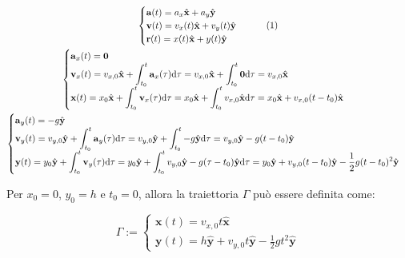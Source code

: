 \documentclass{article}
\newcommand{\vect}[1]{\boldsymbol{\mathbf{#1}}}
\newcommand{\df}{\mathrm{d}}
\numberwithin{equation}{subsection}
\begin{document}
\begin{gather*}
    \begin{cases}
        \vect{a}(t) = a_x\hat{\vect{x}} +a_y\hat{\vect{y}}\\
        \vect{v}(t) = v_x(t)\hat{\vect{x}} + v_y(t)\hat{\vect{y}}\\
        \vect{r}(t) = x(t)\hat{\vect{x}} + y(t)\hat{\vect{y}}
    \end{cases}\tag{\stepcounter{equation}\theequation}\\
    \begin{cases}
        \vect{a}_x(t) = \vect{0}\\
        \vect{v}_x(t) =\displaystyle v_{x,0}\hat{\vect{x}}+\int_{t_0}^{t}\vect{a}_x(\tau)\df\tau=v_{x,0}\hat{\vect{x}}+ \int_{t_0}^{t}\vect{0}\df\tau=v_{x,0}\hat{\vect{x}}\\
        \vect{x}(t) = \displaystyle x_0\hat{\vect{x}}+\int_{t_0}^{t}\vect{v}_x(\tau)\df\tau = x_0\hat{\vect{x}}+\int_{t_0}^{t}v_{x,0}\hat{\vect{x}}\df\tau=x_0\hat{\vect{x}}+v_{x,0}(t-t_0)\hat{\vect{x}}
    \end{cases}\\
    \begin{cases}
        \vect{a}_y(t)=-g\hat{\vect{y}}\\
        \vect{v}_y(t)=\displaystyle v_{y,0}\hat{\vect{y}}+\int_{t_0}^{t}\vect{a}_y(\tau)\df\tau=v_{y,0}\hat{\vect{y}}+\int_{t_0}^{t}-g\hat{\vect{y}}\df\tau=v_{y,0}\hat{\vect{y}}-g(t-t_0)\hat{\vect{y}}\\
        \vect{y}(t)=y_0\hat{\vect{y}} +\displaystyle\int_{t_0}^{t}\vect{v}_y(\tau)\df\tau=y_0\hat{\vect{y}}+\int_{t_0}^{t}v_{y,0}\hat{\vect{y}}-g(\tau-t_0)\hat{\vect{y}}\df\tau=
        y_0\hat{\vect{y}}+v_{y,0}(t-t_0)\hat{\vect{y}}-\frac{1}{2}g(t-t_0)^{2}\hat{\vect{y}}
    \end{cases}
\end{gather*}

Per $x_0 = 0$, $y_0 = h$ e $t_0 = 0$, allora la traiettoria 
$\Gamma$ può essere definita come:

\begin{equation}
    \Gamma:=
    \begin{cases}
        \vect{x}(t)=v_{x,0}t\hat{\vect{x}}\\
        \vect{y}(t)=\displaystyle h\hat{\vect{y}}+v_{y,0}t\hat{\vect{y}}-\frac{1}{2}gt^{2}\hat{\vect{y}}
    \end{cases}
\end{equation}
\end{document}
